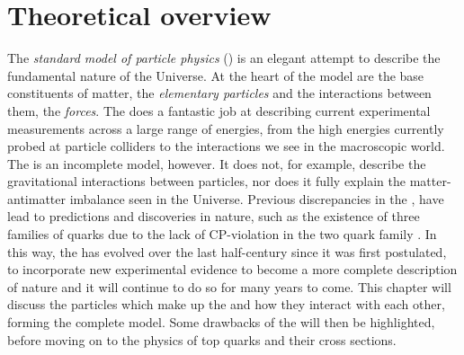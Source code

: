 \chapter{Theoretical overview}
\label{ch:Theory}

The \textit{standard model of particle physics} (\SM{}) is an elegant attempt to describe the fundamental nature of the Universe.
At the heart of the model are the base constituents of matter, the \textit{elementary particles} and the interactions between them, the \textit{forces}.
The \SM{} does a fantastic job at describing current experimental measurements across a large range of energies, from the high energies currently probed at particle colliders to the interactions we see in the macroscopic world.
The \SM{} is an incomplete model, however. 
It does not, for example, describe the gravitational interactions between particles, nor does it fully explain the matter-antimatter imbalance seen in the Universe.
Previous discrepancies in the \SM{}, have lead to predictions and discoveries in nature, such as the existence of three families of quarks due to the lack of CP-violation in the two quark family \SM{}. 
In this way, the \SM{} has evolved over the last half-century since it was first postulated, to incorporate new experimental evidence to become a more complete description of nature and it will continue to do so for many years to come.
This chapter will discuss the particles which make up the \SM{} and how they interact with each other, forming the complete model.
Some drawbacks of the \SM{} will then be highlighted, before moving on to the physics of top quarks and their cross sections.







% 




